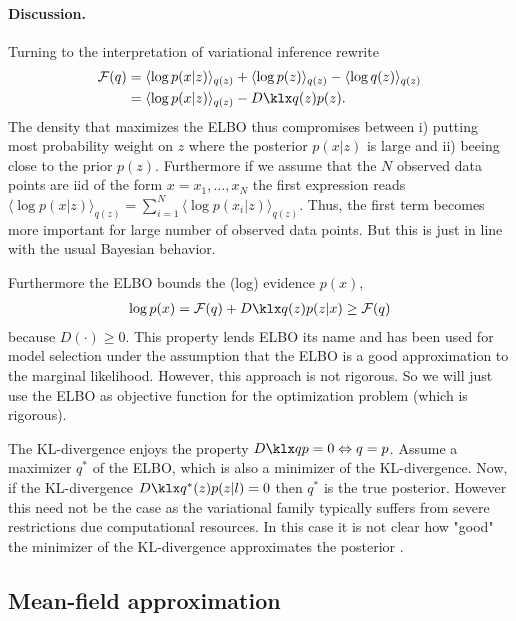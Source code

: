 \paragraph{Discussion.}Turning to the interpretation of variational inference rewrite
\begin{align}
	\mathcal{F}(q) &= \langle \log p(x | z) \rangle _{q(z)} + \langle \log p(z) \rangle _{q(z)}  - \langle \log q(z) \rangle _{q(z)} \nonumber \\ 
	        &= \langle \log p(x | z) \rangle _{q(z)} - \kl{q(z)}{p(z)}.
\end{align}
The density that maximizes the ELBO thus compromises between  i) putting most probability weight on $z$ where the posterior $p(x|z)$ is large and ii) beeing close to the prior $p(z)$. Furthermore if we assume that the $N$ observed data points are iid of the form $x = x_1, \dots, x_N$  the first expression reads $\langle \log p(x | z) \rangle _{q(z)} = \sum _{i = 1} ^N\langle \log p(x_i | z) \rangle _{q(z)}$. Thus, the first term becomes more important for large number of observed data points. But this is just in line with the usual Bayesian behavior.

Furthermore the ELBO bounds the (log) evidence $p(x)$,
\begin{align}
	\log p(x) = \mathcal{F}(q) + \kl{q(z)}{p(z|x)} \geq \mathcal{F}(q)
\end{align}
because $D(\cdot) \geq 0$. This property lends ELBO its name and has been used for model selection under the assumption that the ELBO is a good approximation to the marginal likelihood. However, this approach is not rigorous. So we will just use the ELBO as objective function for the optimization problem (which is rigorous).

The KL-divergence enjoys the property $\kl{q}{p} = 0 \Leftrightarrow q=p$. Assume a maximizer $q^*$ of the ELBO, which is also a minimizer of the KL-divergence. Now, if the KL-divergence  $\kl{q^*(z)}{p(z|l)} = 0$ then $q^*$ is the true posterior. However this need not be the case as the variational family typically suffers from severe restrictions due computational resources. In this case it is not clear how "good" the minimizer of the KL-divergence approximates the posterior \cite{minka2005divergence, Leisink01atighter}.

\subsection{Mean-field approximation}

